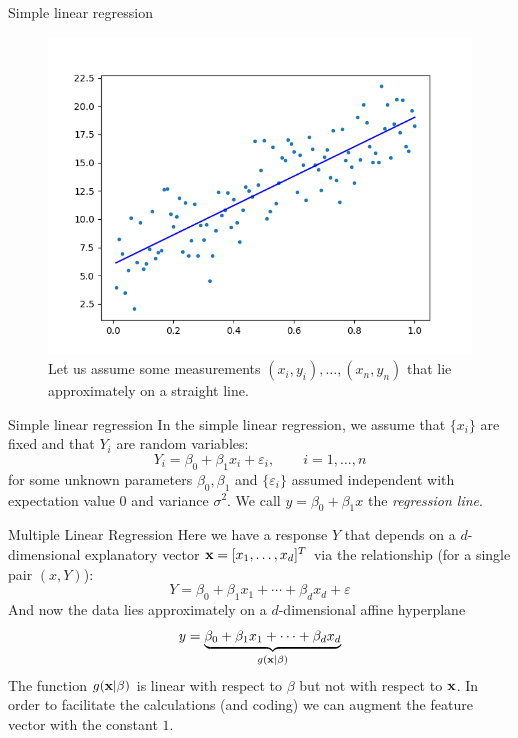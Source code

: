 \documentclass{beamer}
\begin{document}
\begin{frame}{Simple linear regression}
        \begin{figure}
            \includegraphics[width=0.7\linewidth]{linreg}
            \caption{Let us assume some measurements $(x_i,y_i),\ldots,(x_n,y_n)$ that lie approximately on a straight line.}
        \end{figure}
\end{frame}

\begin{frame}{Simple linear regression}
    In the simple linear regression, we assume that $\{x_i\}$ are fixed and that $Y_i$ are random variables:
    \[
        Y_i = \beta_0 + \beta_1 x_i + \varepsilon_i, \qquad i=1, \ldots, n 
    \]
    for some unknown parameters $\beta_0,\beta_1$ and $\{\varepsilon_i\}$ assumed independent with expectation value 0 and variance $\sigma^2$. We call $y=\beta_0+\beta_1x$ the {\em regression line}.
\end{frame}

\begin{frame}{Multiple Linear Regression}
    Here we have a response $Y$ that depends on a $d$-dimensional explanatory vector $\textbf{x}=[x_1,\ldots,x_d]^T$ via the relationship (for a single pair $(x,Y)$):
    \[
        Y = \beta_0 + \beta_1 x_1 + \cdots + \beta_d x_d +\varepsilon 
    \]
    And now the data lies approximately on a $d$-dimensional affine hyperplane
    \[y=\underbrace{\beta_0 + \beta_1 x_1 + \cdots + \beta_d x_d}_{g(\textbf{x}|\beta)}\]
    The function $g(\textbf{x}|\beta)$ is linear with respect to $\beta$ but not with respect to $\textbf{x}$. In order to facilitate the calculations (and coding) we can augment the feature vector with the constant $1$. 
\end{frame}
\end{document}
